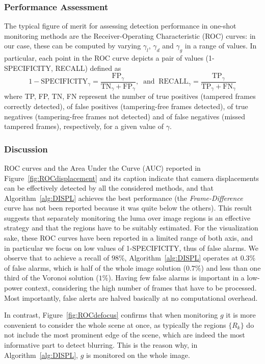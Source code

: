 \documentclass{llncs}
\begin{document}
\subsubsection{Performance Assessment}
The typical figure of merit for assessing detection performance in one-shot monitoring methods are the Receiver-Operating Characteristic (ROC) curves: in our case, these can be computed by varying $\gamma_l$, $\gamma_d$ and $\gamma_g$ in a range of values. In particular, each point in the ROC curve depicts a pair of values (1-SPECIFICITY, RECALL) defined as
\[1-\text{SPECIFICITY}_\gamma = \frac{\text{FP}_\gamma}{\text{TN}_\gamma+\text{FP}_\gamma}, \ \text{ and } \ \text{RECALL}_\gamma=\frac{\text{TP}_\gamma}{\text{TP}_\gamma+\text{FN}_\gamma}\]
where TP, FP, TN, FN represent the number of true positives (tampered frames correctly detected), of false positives (tampering-free frames detected), of true negatives (tampering-free frames not detected) and of false negatives (missed tampered frames), respectively, for a given value of $\gamma$.
\vspace{-0.3cm}
\subsubsection{Discussion}
ROC curves and the Area Under the Curve (AUC) reported in Figure~\ref{fig:ROCdisplacement} and its caption indicate that camera displacements can be effectively detected by all the considered methods, and that Algorithm~\ref{alg:DISPL} achieves the best performance (the \emph{Frame-Difference} curve has not been reported because it was quite below the others). This result suggests that separately monitoring the luma over image regions is an effective strategy and that the regions have to be suitably estimated. For the visualization sake, these ROC curves have been reported in a limited range of both axis, and in particular we focus on low values of 1-SPECIFICITY, thus of false alarms. We observe that to achieve a recall of $98\%$, Algorithm~\ref{alg:DISPL} operates at $0.3\%$ of false alarms, which is half of the whole image solution ($0.7\%$) and less than one third of the Voronoi solution ($1\%$). Having few false alarms is important in a low-power context, considering the high number of frames that have to be processed. Most importantly, false alerts are halved basically at no computational overhead.

In contrast, Figure~\ref{fig:ROCdefocus} confirms that when monitoring $g$ it is more convenient to consider the whole scene at once, as typically the regions $\{R_k\}$ do not include the most prominent edge of the scene, which are indeed the most informative part to detect blurring. This is the reason why, in Algorithm~\ref{alg:DISPL}, $g$ is monitored on the whole image.
\end{document}
